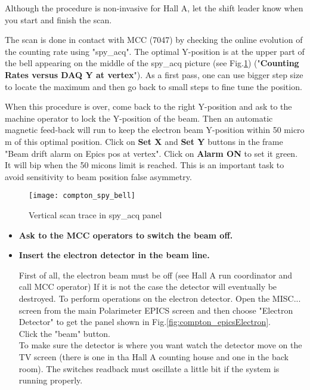 {Although the procedure is non-invasive for Hall A, let the shift leader know
when you start and finish the scan.

The scan is done in contact with MCC (7047) by checking the online evolution
        of the counting rate using "spy\_acq".
        The optimal Y-position is at the upper part of the bell appearing
        on the middle of the spy\_acq picture (see Fig.\ref{fig:compton_spy_bell}) 
	("{\bf Counting Rates versus DAQ Y
        at vertex}"). As a first pass, one can use bigger step size to locate
        the maximum and then go back to small steps to fine tune the position.

When this procedure is over, come back to the right Y-position and
        ask to the machine operator to lock the Y-position of the beam. Then an
        automatic magnetic feed-back will run to keep the electron beam Y-position
        within 50 micro m of this optimal position. Click on {\bf Set X} and
        {\bf Set Y} buttons in the frame "Beam drift alarm on Epics pos at vertex".
        Click on {\bf Alarm ON} to set it green. It will bip when the 50 micons limit
        is reached. This is an important task to avoid sensitivity to beam position
        false asymmetry.
\begin{figure}[htp]
    \begin{center}
        \texttt{[image: compton\_spy\_bell]}
    \end{center}
       \caption[compton:vertical scan]{Vertical scan trace in spy\_acq panel}
        \label{fig:compton_spy_bell}
\end{figure}

\begin{itemize}
\item {\bf Ask to the MCC operators to switch the beam off.}


\item {\bf Insert the electron detector in the beam line.}

First of all, the electron beam must
be off (see Hall A run coordinator and call MCC operator)
If it is not the case the detector will eventually be destroyed.
To perform operations on the electron detector. Open the MISC... screen from 
the main Polarimeter EPICS screen
and then choose "Electron Detector" to get the panel shown in 
Fig.\ref{fig:compton_epicsElectron}.\\

Click the "beam" button.\\
To make sure the detector is where you want watch the detector move on the TV screen (there is one
in tha Hall A counting house and one in the back room). The switches readback must oscillate a
little bit if the system is running properly.


\end{itemize}}
